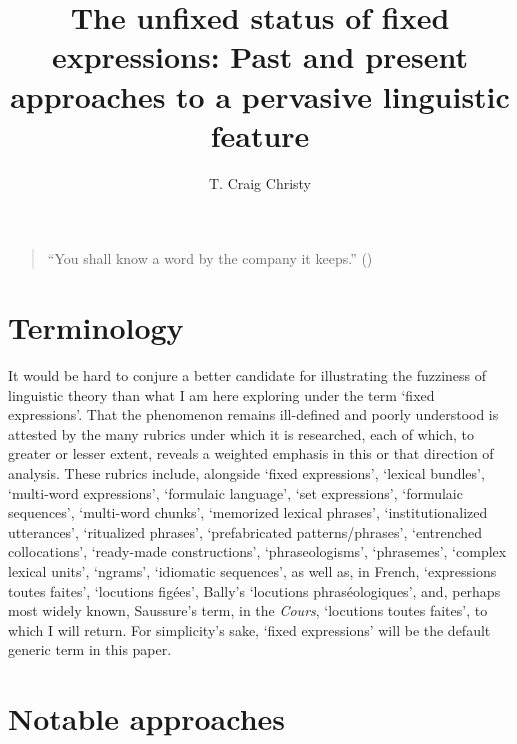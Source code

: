 \documentclass[output=paper]{langsci/langscibook}
\author{T. Craig Christy\affiliation{University of North Alabama}\orcid{}}
\title{The unfixed status of fixed expressions: Past and present approaches to a pervasive linguistic feature}
\begin{document}
\maketitle
\begin{quote}
“You shall know a word by the company it keeps.” (\citealt[11]{firth_synopsis_1957})
\end{quote}

\section{Terminology}

It would be hard to conjure a better candidate for illustrating the fuzziness of linguistic theory than what I am here exploring under the term ‘fixed expressions’. That the phenomenon remains ill-defined and poorly understood is attested by the many rubrics under which it is researched, each of which, to greater or lesser extent, reveals a weighted emphasis in this or that direction of analysis. These rubrics include, alongside ‘fixed expressions’, ‘lexical bundles’, ‘multi-word expressions’, ‘formulaic language’, ‘set expressions’, ‘formulaic sequences’, ‘multi-word chunks’, ‘memorized lexical phrases’, ‘institutionalized utterances’, ‘ritualized phrases’, ‘prefabricated patterns/phrases’, ‘entrenched collocations’, ‘ready-made constructions’, ‘phraseologisms’, ‘phrasemes’, ‘complex lexical units’, ‘ngrams’, ‘idiomatic sequences’, as well as, in French, ‘expressions toutes faites’, ‘locutions figées’, Bally’s ‘locutions phraséologiques’, and, perhaps most widely known, Saussure’s term, in the \textit{Cours}, ‘locutions toutes faites’, to which I will return. For simplicity’s sake, ‘fixed expressions’ will be the default generic term in this paper. 

\section{Notable approaches}
\end{document}
